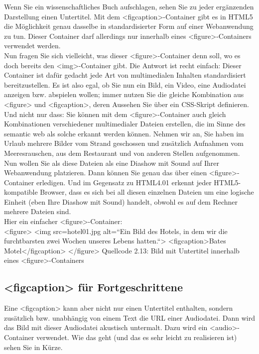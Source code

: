 Wenn Sie ein wissenschaftliches Buch aufschlagen, sehen Sie zu jeder ergänzenden Darstellung einen Untertitel. Mit dem <figcaption>-Container gibt es in HTML5 die Möglichkeit genau dasselbe in standardisierter Form auf einer Webanwendung zu tun. Dieser Container darf allerdings nur innerhalb eines <figure>-Containers verwendet werden.\\

Nun fragen Sie sich vielleicht, was dieser <figure>-Container denn soll, wo es doch bereits den <img>-Container gibt. Die Antwort ist recht einfach: Dieser Container ist dafür gedacht jede Art von multimedialen Inhalten standardisiert bereitzustellen. Es ist also egal, ob Sie nun ein Bild, ein Video, eine Audiodatei anzeigen bzw. abspielen wollen; immer nutzen Sie die gleiche Kombination aus <figure> und <figcaption>, deren Aussehen Sie über ein CSS-Skript definieren.\\

Und nicht nur dass: Sie können mit dem <figure>-Container auch gleich Kombinationen verschiedener multimedialer Dateien erstellen, die im Sinne des semantic web als solche erkannt werden können. Nehmen wir an, Sie haben im Urlaub mehrere Bilder vom Strand geschossen und zusätzlich Aufnahmen vom Meeresrauschen, aus dem Restaurant und von anderen Stellen aufgenommen. Nun wollen Sie als diese Dateien als eine Diashow mit Sound auf Ihrer Webanwendung platzieren. Dann können Sie genau das über einen <figure>-Container erledigen. Und im Gegensatz zu HTML4.01 erkennt jeder HTML5-kompatible Browser, dass es sich bei all diesen einzelnen Dateien um eine logische Einheit (eben Ihre Diashow mit Sound) handelt, obwohl es auf dem Rechner mehrere Dateien sind.\\

Hier ein einfacher <figure>-Container:\\

<figure>
<img src=hotel01.jpg alt=“Ein Bild des Hotels, in dem wir die furchtbarsten zwei Wochen unseres Lebens hatten.“>
<figcaption>Bates Motel</figcaption>
</figure>
Quellcode 2.13: Bild mit Untertitel innerhalb eines <figure>-Containers

\subsection{<figcaption> für Fortgeschrittene}

Eine <figcaption> kann aber nicht nur einen Untertitel enthalten, sondern zusätzlich bzw. unabhängig von einem Text die URL einer Audiodatei. Dann wird das Bild mit dieser Audiodatei akustisch untermalt. Dazu wird ein <audio>-Container verwendet. Wie das geht (und das es sehr leicht zu realisieren ist) sehen Sie in Kürze.

